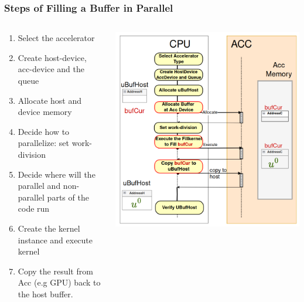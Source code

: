 \documentclass[9pt]{beamer}
\begin{document}
\begin{frame}
\frametitle{Steps of Filling a Buffer in Parallel}
\begin{columns}

    \begin{column}{0.55\textwidth} %
    \begin{enumerate}
     \item Select the accelerator
     \item Create host-device, acc-device and the queue
     \item Allocate host and device memory
     \item Decide how to parallelize: set work-division
     \item Decide where will the parallel and non-parallel parts of the code run
     \item Create the kernel instance and execute kernel
     \item Copy the result from Acc (e.g GPU) back to the host buffer.
    \end{enumerate}
    \end{column}

    \begin{column}{0.45\textwidth} %
        \centering
        \includegraphics[width=\linewidth]{Screenshot from 2024-09-25 12-39-55.png} %
    \end{column}

\end{columns}


    \end{frame}
\end{document}
